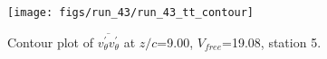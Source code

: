 \begin{figure}[H]
\centering
\texttt{[image: figs/run\_43/run\_43\_tt\_contour]}
\caption{Contour plot of $\overline{v_{\theta}^{\prime} v_{\theta}^{\prime}}$ at $z/c$=9.00, $V_{free}$=19.08, station 5.}
\label{fig:run_43_tt_contour}
\end{figure}


